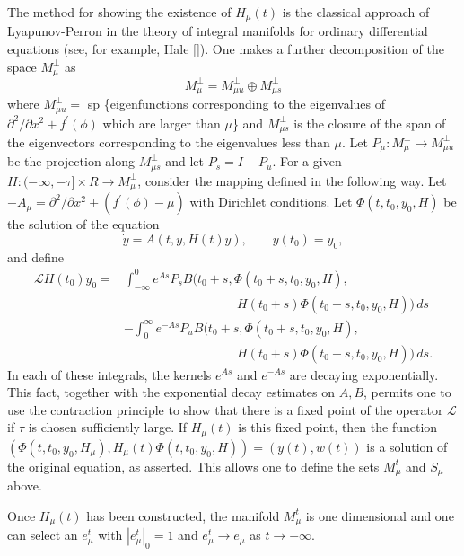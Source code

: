 \documentclass{surv-l}
\theoremstyle{plain}
\theoremstyle{definition}
\numberwithin{equation}{section}
\numberwithin{figure}{chapter}
\begin{document}
The method for showing the existence of $H_{\mu}(t)$ is the classical approach of Lyapunov-Perron in the theory of integral manifolds for ordinary differential equations (see, for example, Hale [\citeyear{1969h}]). One makes a further decomposition of the space $M_{\mu}^{\perp}$ as
\begin{equation*}
M_{\mu}^{\perp}=M_{\mu u}^{\perp}\oplus M_{\mu s}^{\perp}
\end{equation*}
where $M_{\mu u}^{\perp}=$ sp \{eigenfunctions corresponding to the eigenvalues of $\partial^{2}/\partial x^{2}+ f^{\prime}(\phi)$ which are larger than $\mu$\} and $M_{\mu s}^{\perp}$ is the closure of the span of the eigenvectors corresponding to the eigenvalues less than $\mu$. Let $P_{\mu}\!:M_{\mu}^{\perp}\rightarrow M_{\mu u}^{\perp}$ be the projection along $M_{\mu s}^{\perp}$ and let $P_{s}=I-P_{u}$. For a given $H\!:(-\infty, -\tau]\times R\rightarrow M_{\mu}^{\perp}$, consider the mapping defined in the following way. Let $-A_{\mu}=\partial^{2}/\partial x^{2}+ (f^{\prime}(\phi)-\mu)$ with Dirichlet conditions. Let $\Phi(t, t_{0}, y_{0}, H)$ be the solution of the equation
\begin{equation*}
\dot{y}=A(t, y, H(t)y),\qquad y(t_{0})=y_{0},
\end{equation*}
and define
\begin{align*}
\mathcal{L}H(t_{0})y_{0}=&\int_{-\infty}^{0}e^{As}P_{s}B(t_{0}+s, \Phi(t_{0}+s, t_{0}, y_{0}, H),\\
&\qquad \qquad \qquad \qquad \quad H(t_{0}+s)\Phi(t_{0}+s, t_{0}, y_{0}, H))\,ds\\
&-\int_{0}^{\infty}e^{-As}P_{u}B(t_{0}+s, \Phi(t_{0}+s, t_{0}, y_{0}, H),\\
&\qquad \qquad \qquad \qquad \quad H(t_{0}+s)\Phi(t_{0}+s, t_{0}, y_{0}, H))\,ds.
\end{align*}
In each of these integrals, the kernels $e^{As}$ and $e^{-As}$ are decaying exponentially. This fact, together with the exponential decay estimates on $A, B$, permits one to use the contraction principle to show that there is a fixed point of the operator $\mathcal{L}$ if $\tau$ is chosen sufficiently large. If $H_{\mu}(t)$ is this fixed point, then the function $(\Phi(t, t_{0}, y_{0}, H_{\mu}), H_{\mu}(t)\Phi(t, t_{0}, y_{0}, H))=(y(t), w(t))$ is a solution of the original equation, as asserted. This allows one to define the sets $M_{\mu}^{t}$ and $S_{\mu}$ above.

Once $H_{\mu}(t)$ has been constructed, the manifold $M_{\mu}^{t}$ is one dimensional and one can select an $e_{\mu}^{t}$ with $|e_{\mu}^{t}|_{0}=1$ and $e_{\mu}^{t}\rightarrow e_{\mu}$ as $ t\rightarrow-\infty$.
\end{document}
